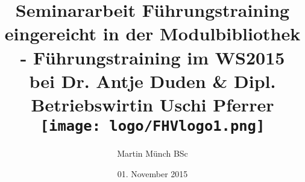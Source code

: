\title{
	{Seminararbeit Führungstraining}\\
	{\large eingereicht in der Modulbibliothek - Führungstraining im WS2015}\\
	{\large bei Dr. Antje Duden \& Dipl. Betriebswirtin Uschi Pferrer}\\ [1cm]
	{\texttt{[image: logo/FHVlogo1.png]}} \\ [1cm]
}
\author{Martin Münch BSc}
\date{01. November 2015}



\maketitle

